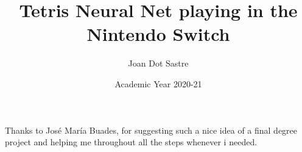 \documentclass[english,GINF]{TFGEPSUIB}
\title{Tetris Neural Net playing in the Nintendo Switch}
\author{Joan Dot Sastre}
\date{Academic Year 2020-21}
\begin{document}
\portada
\portadainterior
\frontmatter

%
\cleartorecto \thispagestyle{empty}
\begin{agraiments}
Thanks to José María Buades, for suggesting such a nice idea of a final degree project and helping me throughout all the steps whenever i needed.
\end{agraiments}

\cleartorecto \tableofcontents


 

 

\mainmatter\pagestyle{ruled}













\appendix 
 



\backmatter



% 
\end{document}
